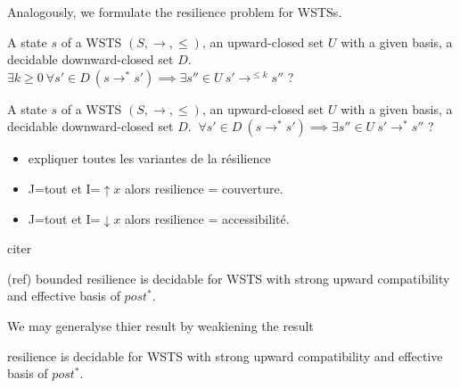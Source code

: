 Analogously, we formulate the resilience problem for WSTSs.

{A state $s$ of a WSTS $(S,\rightarrow, \leq)$, an upward-closed set $U$ with a given basis, a decidable downward-closed set $D$.}
{$\exists k \geq 0 ~ \forall s' \in D ~ (s \rightarrow^* s') \implies \exists s'' \in U ~ s' \rightarrow^{\leq k} s''$ ?\newline}

{A state $s$ of a WSTS $(S,\rightarrow, \leq)$, an upward-closed set $U$ with a given basis, a decidable downward-closed set $D$.}
{$ ~ \forall s' \in D ~ (s \rightarrow^* s') \implies \exists s'' \in U ~ s' \rightarrow^{*} s''$ ?\newline}



\begin{remark}
\begin{itemize}
\item expliquer toutes les variantes de la résilience
\item J=tout et I=$\uparrow x$ alors resilience = couverture.
\item J=tout et I=$\downarrow x$ alors resilience = accessibilité.
\end{itemize}
\end{remark}



citer 


\begin{theorem}(ref)
{\sc bounded resilience} is decidable for WSTS with strong upward compatibility and effective basis of $post^*$.
\end{theorem}

We may generalyse thier result by weakiening the result

\begin{corollary}
{\sc resilience} is decidable for WSTS with strong upward compatibility and effective basis of $post^*$.
\end{corollary}


